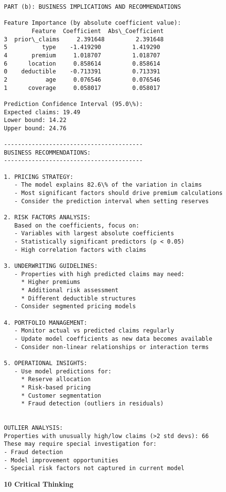 \documentclass[8pt, twocolumn]{extarticle}
\begin{document}
    \begin{Verbatim}[commandchars=\\\{\}]
PART (b): BUSINESS IMPLICATIONS AND RECOMMENDATIONS

Feature Importance (by absolute coefficient value):
        Feature  Coefficient  Abs\_Coefficient
3  prior\_claims     2.391648         2.391648
5          type    -1.419290         1.419290
4       premium     1.018707         1.018707
6      location     0.858614         0.858614
0    deductible    -0.713391         0.713391
2           age     0.076546         0.076546
1      coverage     0.058017         0.058017

Prediction Confidence Interval (95.0\%):
Expected claims: 19.49
Lower bound: 14.22
Upper bound: 24.76

----------------------------------------
BUSINESS RECOMMENDATIONS:
----------------------------------------

1. PRICING STRATEGY:
   - The model explains 82.6\% of the variation in claims
   - Most significant factors should drive premium calculations
   - Consider the prediction interval when setting reserves

2. RISK FACTORS ANALYSIS:
   Based on the coefficients, focus on:
   - Variables with largest absolute coefficients
   - Statistically significant predictors (p < 0.05)
   - High correlation factors with claims

3. UNDERWRITING GUIDELINES:
   - Properties with high predicted claims may need:
     * Higher premiums
     * Additional risk assessment
     * Different deductible structures
   - Consider segmented pricing models

4. PORTFOLIO MANAGEMENT:
   - Monitor actual vs predicted claims regularly
   - Update model coefficients as new data becomes available
   - Consider non-linear relationships or interaction terms

5. OPERATIONAL INSIGHTS:
   - Use model predictions for:
     * Reserve allocation
     * Risk-based pricing
     * Customer segmentation
     * Fraud detection (outliers in residuals)


OUTLIER ANALYSIS:
Properties with unusually high/low claims (>2 std devs): 66
These may require special investigation for:
- Fraud detection
- Model improvement opportunities
- Special risk factors not captured in current model
    \end{Verbatim}
    \textbf{10 Critical Thinking}
\end{document}
